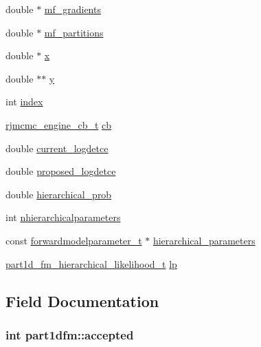 \begin{DoxyCompactItemize}
\item 
double $\ast$ \hyperlink{structpart1dfm_ada4048863eed80775717e783b8d02ec5}{mf\+\_\+gradients}
\item 
double $\ast$ \hyperlink{structpart1dfm_a795409d0548dcdc982e04d1c2fec1010}{mf\+\_\+partitions}
\item 
double $\ast$ \hyperlink{structpart1dfm_a43c76d5f2756aca4d037e8d1f06e454f}{x}
\item 
double $\ast$$\ast$ \hyperlink{structpart1dfm_a9b3c68d30d4e9f3e607dd6063f770b36}{y}
\item 
int \hyperlink{structpart1dfm_aa05cf42805bbef44affc42a6904c92d3}{index}
\item 
\hyperlink{engine_8h_a83b197be2c616cd7551a3cd6ed15cc3c}{rjmcmc\+\_\+engine\+\_\+cb\+\_\+t} \hyperlink{structpart1dfm_a8cfbc803c3312c6eb1d8f2a1da847bb6}{cb}
\item 
double \hyperlink{structpart1dfm_aeb4eb5c676abbb3b7c7f58c5761e6e65}{current\+\_\+logdetce}
\item 
double \hyperlink{structpart1dfm_a2f03ff0e7c16c73a4e3c109e559ed9af}{proposed\+\_\+logdetce}
\item 
double \hyperlink{structpart1dfm_a8b03bc8981487f375fa3e9e287e7e820}{hierarchical\+\_\+prob}
\item 
int \hyperlink{structpart1dfm_a6e33f7b8588bf074fc851fddcd358d44}{nhierarchicalparameters}
\item 
const \hyperlink{forwardmodelparameter_8h_a18a7d2fd51fab097145725d83ac328e3}{forwardmodelparameter\+\_\+t} $\ast$ \hyperlink{structpart1dfm_a3fcdeb881a4b7363a3a2f6a2463d71ec}{hierarchical\+\_\+parameters}
\item 
\hyperlink{forwardmodel_8h_ab52d410e89a70e92c92362c32d135e45}{part1d\+\_\+fm\+\_\+hierarchical\+\_\+likelihood\+\_\+t} \hyperlink{structpart1dfm_a87c96fbd07d516e02796d77d36209c57}{lp}
\end{DoxyCompactItemize}


\subsection{Field Documentation}
\subsubsection[{\texorpdfstring{accepted}{accepted}}]{\setlength{\rightskip}{0pt plus 5cm}int part1dfm\+::accepted}\hypertarget{structpart1dfm_a42fef2ae5491be7e1fed1ffac1c1bd0a}{}\label{structpart1dfm_a42fef2ae5491be7e1fed1ffac1c1bd0a}


